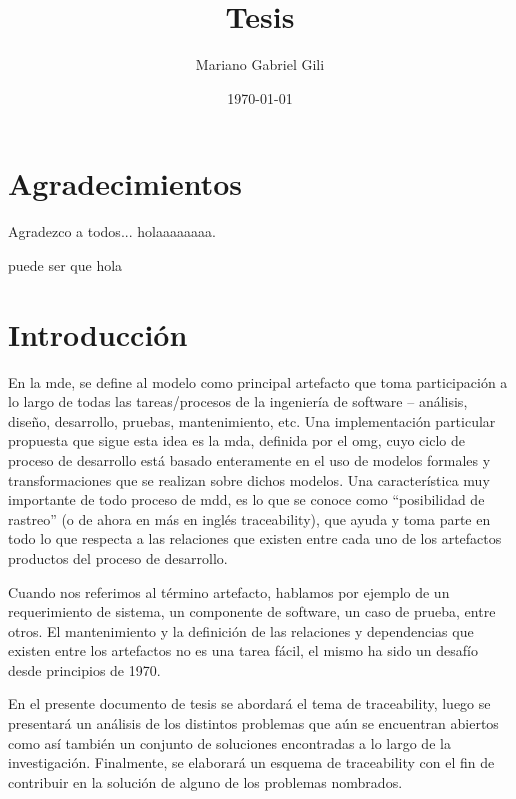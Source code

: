 \documentclass[a4paper,12pt,oneside,spanish]{book}
\author{Mariano Gabriel Gili}
\title{Tesis}
\date{\today}
\begin{document}
 \maketitle

\frontmatter
\tableofcontents
\listoffigures


\chapter{Agradecimientos}


Agradezco a todos...  holaaaaaaaa.

puede ser que \gls{hola}


\chapter{Introducción}


En la \gls{mde}, se define al modelo como principal artefacto que toma participación a lo largo de todas las tareas/procesos de la ingeniería de software – análisis, diseño, desarrollo, pruebas, mantenimiento, etc. Una implementación particular propuesta que sigue esta idea es la \gls{mda}, definida por el \gls{omg}, cuyo ciclo de proceso de desarrollo está basado enteramente en el uso de modelos formales y transformaciones que se realizan sobre dichos modelos. Una característica muy importante de todo proceso de \gls{mdd}, es lo que se conoce como “posibilidad de rastreo” (o de ahora en más en inglés traceability), que ayuda y toma parte en todo lo que respecta a las relaciones que existen entre cada uno de los artefactos productos del proceso de desarrollo.

Cuando nos referimos al término artefacto, hablamos por ejemplo de un requerimiento de sistema, un componente de software, un caso de prueba, entre otros. El mantenimiento y la definición de las relaciones y dependencias que existen entre los artefactos no es una tarea fácil, el mismo ha sido un desafío desde principios de 1970.

En el presente documento de tesis se abordará el tema de traceability, luego se presentará un análisis de los distintos problemas que aún se encuentran abiertos como así también un conjunto de soluciones encontradas a lo largo de la investigación. Finalmente, se elaborará un esquema de traceability con el fin de contribuir en la solución de alguno de los problemas nombrados.
\end{document}
